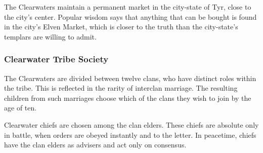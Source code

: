 The Clearwaters maintain a permanent market in the city-state of Tyr, close to the city's center. Popular wisdom says that anything that can be bought is found in the city's Elven Market, which is closer to the truth than the city-state's templars are willing to admit.

\subsubsection{Clearwater Tribe Society}
The Clearwaters are divided between twelve clans, who have distinct roles within the tribe. This is reflected in the rarity of interclan marriage. The resulting children from such marriages choose which of the clans they wish to join by the age of ten.

Clearwater chiefs are chosen among the clan elders. These chiefs are absolute only in battle, when orders are obeyed instantly and to the letter. In peacetime, chiefs have the clan elders as advisers and act only on consensus.








